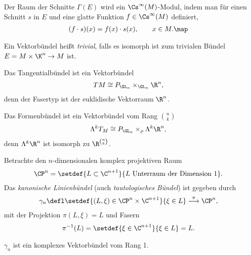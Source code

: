 \documentclass[%
	paper=a5,%
	fleqn,%
	DIV=18,%
	BCOR=0mm,
	fontsize=11pt,
	titlepage=false,%
	bibliography=totoc,
	DIV=18,%
	twoside=true,
	pdftitle=Riemannsche Geometrie,
	pdfauthor=Uwe Semmelmann,
	numbers=noendperiod]%
	{scrbook}
\begin{document}
\begin{rem}
Der Raum der Schnitte 
$\Gamma(E)$ wird ein $\Cs^\infty(M)$-Modul, indem man für einen Schnitt $s$ in
$E$ und eine glatte Funktion $f\in\Cs^\infty(M)$ definiert,
\begin{align*}
(f\cdot s)(x) = f(x)\cdot s(x),\qquad x\in M.\map
\end{align*}
\end{rem}

\begin{defn}
Ein Vektorbündel heißt \emph{trivial}, falls es isomorph ist zum trivialen
Bündel $E=M\times \K^n\to M$ ist.\fish
\end{defn}

\begin{ex}
\begin{exenum}
\item
Das Tangentialbündel ist ein Vektorbündel
\begin{align*}
TM \cong P_{\GL_n}\times_{\GL_n}\R^n, 
\end{align*}
denn der Fasertyp ist der euklidische Vektorraum $\R^n$.
\item Das Formenbündel ist ein Vektorbündel vom Rang $\binom{n}{k}$
\begin{align*}
\Lambda^k T_M \cong P_{\GL_n}\times_{\rho}\Lambda^k\R^n,
\end{align*}
denn $\Lambda^k\R^n$ ist isomorph zu $\R^{\binom{n}{k}}$.
\item Betrachte den $n$-dimensionalen komplex projektiven Raum 
\begin{align*} 
\CP^n = \setdef{L\subset \C^{n+1}}{L\text{ Unterraum der Dimension
}1}.
\end{align*}
Das \emph{kanonische Linienbündel} (auch \emph{tautologisches Bündel}) ist
gegeben durch
\begin{align*}
\gamma_n \defl \setdef{(L,\xi)\in \CP^n\times\C^{n+1}}{\xi\in L}
\overset{\pi}{\longrightarrow} \CP^n,
\end{align*}
mit der Projektion $\pi(L,\xi) = L$ und Fasern
\begin{align*}
\pi^{-1}(L) = \setdef{\xi\in\C^{n+1}}{\xi\in L} = L.
\end{align*}
\begin{lem*}
$\gamma_n$ ist ein komplexes Vektorbündel vom Rang 1.\fish
\end{lem*}


\end{exenum}
\end{ex}
\end{document}
